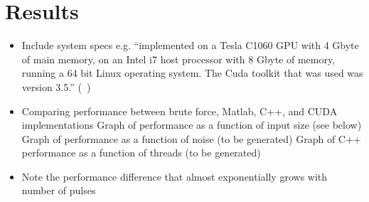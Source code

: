 \section{Results}\label{sec:Results}

\begin{itemize}
  \item Include system specs e.g. ``implemented on a Tesla
    C1060 GPU with 4 Gbyte of main memory, on an Intel i7 host
    processor with 8 Gbyte of memory, running a 64 bit Linux
    operating system. The Cuda toolkit that was used was version
    3.5.'' (~\cite{gpu-sar})
  \item Comparing performance between brute force, Matlab, C++, and CUDA implementations
    \subitem Graph of performance as a function of input size (see below)
    \subitem Graph of performance as a function of noise (to be generated)
    \subitem Graph of C++ performance as a function of threads (to be generated)
  \item Note the performance difference that almost exponentially grows with number of pulses
\end{itemize}

